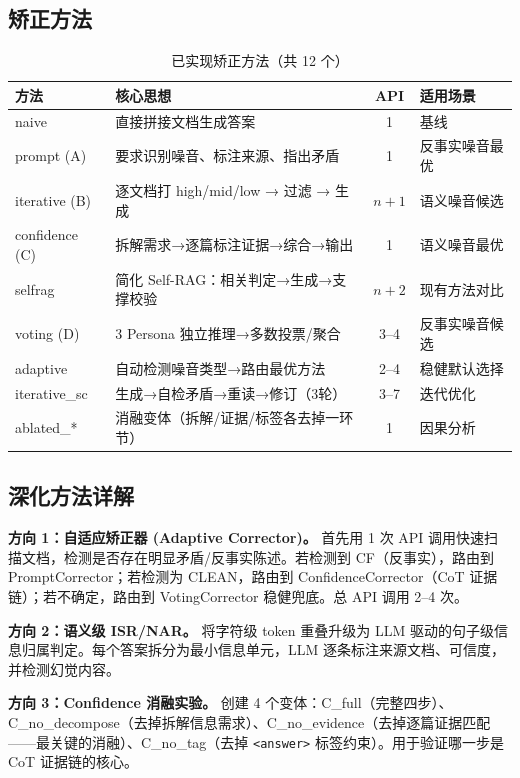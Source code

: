 \documentclass[UTF8,zihao=-4]{ctexart}
\begin{document}
\subsection{矫正方法}

\begin{table}[H]
  \centering
  \caption{已实现矫正方法（共 12 个）}
  \begin{tabularx}{\textwidth}{lYcY}
    \toprule
    方法 & 核心思想 & API & 适用场景 \\
    \midrule
    naive & 直接拼接文档生成答案 & 1 & 基线 \\
    prompt (A) & 要求识别噪音、标注来源、指出矛盾 & 1 & 反事实噪音最优 \\
    iterative (B) & 逐文档打 high/mid/low → 过滤 → 生成 & $n+1$ & 语义噪音候选 \\
    confidence (C) & 拆解需求→逐篇标注证据→综合→输出 & 1 & 语义噪音最优 \\
    selfrag & 简化 Self-RAG：相关判定→生成→支撑校验 & $n+2$ & 现有方法对比 \\
    voting (D) & 3 Persona 独立推理→多数投票/聚合 & 3--4 & 反事实噪音候选 \\
    adaptive & 自动检测噪音类型→路由最优方法 & 2--4 & 稳健默认选择 \\
    iterative\_sc & 生成→自检矛盾→重读→修订（3轮） & 3--7 & 迭代优化 \\
    ablated\_* & 消融变体（拆解/证据/标签各去掉一环节）& 1 & 因果分析 \\
    \bottomrule
  \end{tabularx}
\end{table}

\subsection{深化方法详解}

\textbf{方向 1：自适应矫正器 (Adaptive Corrector)。} 首先用 1 次 API 调用快速扫描文档，检测是否存在明显矛盾/反事实陈述。若检测到 CF（反事实），路由到 PromptCorrector；若检测为 CLEAN，路由到 ConfidenceCorrector（CoT 证据链）；若不确定，路由到 VotingCorrector 稳健兜底。总 API 调用 2--4 次。

\textbf{方向 2：语义级 ISR/NAR。} 将字符级 token 重叠升级为 LLM 驱动的句子级信息归属判定。每个答案拆分为最小信息单元，LLM 逐条标注来源文档、可信度，并检测幻觉内容。

\textbf{方向 3：Confidence 消融实验。} 创建 4 个变体：C\_full（完整四步）、C\_no\_decompose（去掉拆解信息需求）、C\_no\_evidence（去掉逐篇证据匹配——最关键的消融）、C\_no\_tag（去掉 \texttt{<answer>} 标签约束）。用于验证哪一步是 CoT 证据链的核心。
\end{document}
